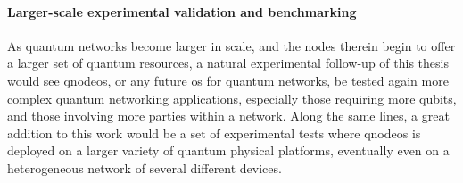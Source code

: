 \paragraph{Larger-scale experimental validation and benchmarking}

As quantum networks become larger in scale, and the nodes therein begin to offer a larger set of
quantum resources, a natural experimental follow-up of this thesis would see \acrshort{qnodeos}, or
any future \acrshort{os} for quantum networks, be tested again more complex quantum networking
applications, especially those requiring more qubits, and those involving more parties within a
network. Along the same lines, a great addition to this work would be a set of experimental tests
where \acrshort{qnodeos} is deployed on a larger variety of quantum physical platforms, eventually
even on a heterogeneous network of several different devices.

\printbibliography[heading=subbibintoc,title={References},notcategory=noprint]
